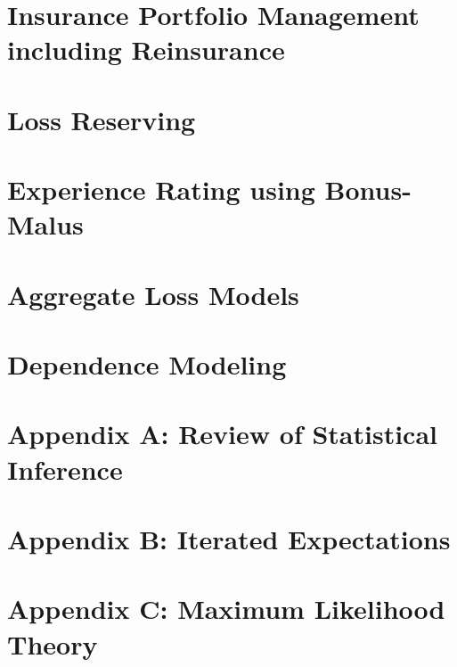 \documentclass[
]{book}
\begin{document}
\hypertarget{insurance-portfolio-management-including-reinsurance}{%
\chapter{Insurance Portfolio Management including Reinsurance}\label{insurance-portfolio-management-including-reinsurance}}

\hypertarget{loss-reserving}{%
\chapter{Loss Reserving}\label{loss-reserving}}

\hypertarget{experience-rating-using-bonus-malus}{%
\chapter{Experience Rating using Bonus-Malus}\label{experience-rating-using-bonus-malus}}

\hypertarget{aggregate-loss-models-1}{%
\chapter{Aggregate Loss Models}\label{aggregate-loss-models-1}}

\hypertarget{dependence-modeling}{%
\chapter{Dependence Modeling}\label{dependence-modeling}}

\hypertarget{appendix-a-review-of-statistical-inference}{%
\chapter{Appendix A: Review of Statistical Inference}\label{appendix-a-review-of-statistical-inference}}

\hypertarget{appendix-b-iterated-expectations}{%
\chapter{Appendix B: Iterated Expectations}\label{appendix-b-iterated-expectations}}

\hypertarget{appendix-c-maximum-likelihood-theory}{%
\chapter{Appendix C: Maximum Likelihood Theory}\label{appendix-c-maximum-likelihood-theory}}
\end{document}
